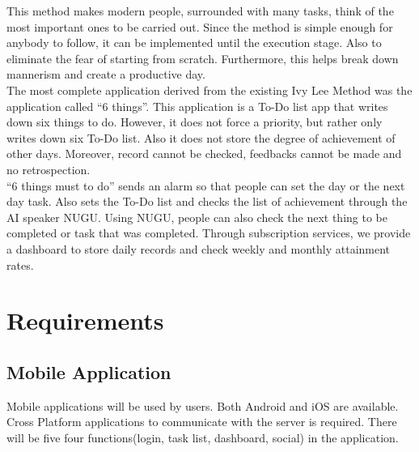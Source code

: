 \documentclass[conference]{IEEEtran}
\begin{document}
This method makes modern people, surrounded with many tasks, think of the most important ones to be carried out. Since the method is simple enough for anybody to follow, it can be implemented until the execution stage. Also to eliminate the fear of starting from scratch. Furthermore, this helps break down mannerism and create a productive day. \\
 
The most complete application derived from the existing Ivy Lee Method was the application called “6 things”. This application is a To-Do list app that writes down six things to do. However, it does not force a priority, but rather only writes down six To-Do list. Also it does not store the degree of achievement of other days. Moreover, record cannot be checked, feedbacks cannot be made and no retrospection. \\

“6 things must to do” sends an alarm so that people can set the day or the next day task. Also sets the To-Do list and checks the list of achievement through the AI speaker NUGU. Using NUGU, people can also check the next thing to be completed or task that was completed. Through subscription services, we provide a dashboard to store daily records and check weekly and monthly attainment rates.\\

\section{Requirements}

\subsection{Mobile Application}

Mobile applications will be used by users. Both Android and iOS are available. Cross Platform applications to communicate with the server is required. There will be five four functions(login, task list, dashboard, social) in the application.\\
\end{document}
